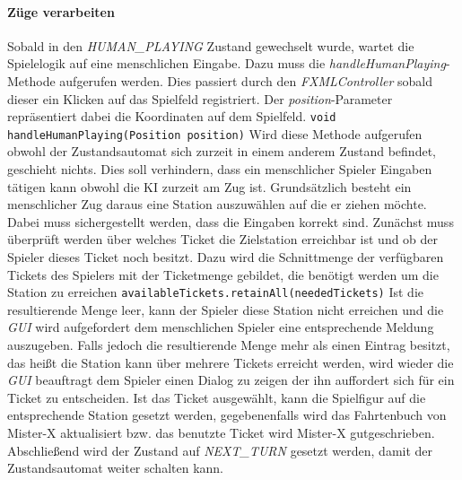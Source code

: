                 \paragraph{Züge verarbeiten}
                    Sobald in den \textit{HUMAN\_PLAYING} Zustand gewechselt wurde, wartet die Spielelogik auf eine menschlichen Eingabe.
                    Dazu muss die \textit{handleHumanPlaying}-Methode aufgerufen werden. Dies passiert durch den \textit{FXMLController}
                    sobald dieser ein Klicken auf das Spielfeld registriert.
                    Der \textit{position}-Parameter repräsentiert dabei die Koordinaten auf dem Spielfeld.
                    \newline
                    \newline
                    \texttt{void handleHumanPlaying(Position position)}
                    \newline
                    \newline
                    Wird diese Methode aufgerufen obwohl der Zustandsautomat sich zurzeit in einem anderem Zustand befindet, geschieht nichts.
                    Dies soll verhindern, dass ein menschlicher Spieler Eingaben tätigen kann obwohl die KI zurzeit am Zug ist.
                    Grundsätzlich besteht ein menschlicher Zug daraus eine Station auszuwählen auf die er ziehen möchte.
                    Dabei muss sichergestellt werden, dass die Eingaben korrekt sind.
                    Zunächst muss überprüft werden über welches Ticket die Zielstation erreichbar ist und ob der Spieler dieses Ticket noch besitzt.
                    Dazu wird die Schnittmenge der verfügbaren Tickets des Spielers mit der Ticketmenge gebildet, die benötigt werden
                    um die Station zu erreichen
                    \newline
                    \newline
                    \texttt{availableTickets.retainAll(neededTickets)}
                    \newline
                    \newline
                    Ist die resultierende Menge leer, kann der Spieler diese Station nicht erreichen und
                    die \textit{GUI} wird aufgefordert dem menschlichen Spieler eine entsprechende Meldung auszugeben.
                    Falls jedoch die resultierende Menge mehr als einen Eintrag besitzt, das heißt die Station kann über mehrere Tickets erreicht werden,
                    wird wieder die \textit{GUI} beauftragt dem Spieler einen Dialog zu zeigen der ihn auffordert sich für ein Ticket zu entscheiden.
                    Ist das Ticket ausgewählt, kann die Spielfigur auf die entsprechende Station gesetzt werden,
                    gegebenenfalls wird das Fahrtenbuch von Mister-X aktualisiert bzw. das benutzte Ticket wird Mister-X gutgeschrieben. 
                    Abschließend wird der Zustand auf \textit{NEXT\_TURN} gesetzt werden, damit der Zustandsautomat weiter schalten kann.


